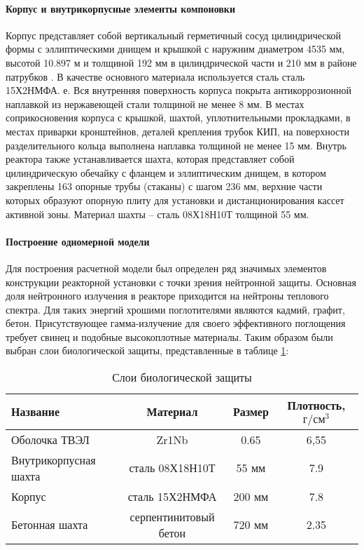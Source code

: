 \paragraph{Корпус и внутрикорпусные элементы компоновки} Корпус представляет собой вертикальный герметичный сосуд
цилиндрической формы с эллиптическими днищем и крышкой  с наружним диаметром 4535 мм, высотой 10.897 м и толщиной 192 мм в цилиндрической части и 210 мм в районе патрубков \cite{лескин2011физические}. В качестве основного материала используется сталь сталь 15Х2НМФА. е. Вся внутренняя поверхность корпуса покрыта
антикоррозионной наплавкой из нержавеющей стали толщиной не
менее 8 мм. В местах соприкосновения корпуса с крышкой, шахтой, уплотнительными прокладками, в местах приварки
кронштейнов, деталей крепления трубок КИП, на поверхности разделительного кольца выполнена наплавка толщиной не менее
15 мм. Внутрь реактора также устанавливается шахта, которая  представляет собой цилиндрическую обечайку с фланцем и эллиптическим днищем, в котором закреплены 163 опорные
трубы (стаканы) с шагом 236 мм, верхние части которых образуют
опорную плиту для установки и дистанционирования кассет активной зоны. Материал шахты – сталь 08Х18Н10Т толщиной 55 мм.

\paragraph{Построение одномерной модели} Для построения расчетной модели был определен ряд значимых элементов конструкции реакторной установки с точки зрения нейтронной защиты. 
Основная доля нейтронного излучения в реакторе приходится на нейтроны теплового спектра. Для таких энергий хрошими поглотителями являются кадмий, графит, бетон. 
Присутствующее гамма-излучение для своего эффективного поглощения требует свинец и подобные высокоплотные материалы. Таким образом были выбран слои биологической защиты, представленные в таблице \ref{tabular:bio-sec-layers}:

\begin{table}[H]
	\caption{Слои биологической защиты}
	\begin{center}
        \begin{tabular}{|l|c|c|c|}
        \toprule
         Название & Материал & Размер & Плотность, $\text{г}/\text{см}^3$ \\ 
         \midrule
         \hline
         Оболочка ТВЭЛ & Zr1Nb & 0.65 & 6,55\\ 
         \hline
         Внутрикорпусная шахта & сталь 08Х18Н10Т & 55 мм & 7.9 \\ 
         \hline
         Корпус & сталь 15Х2НМФА & 200 мм & 7.8 \\ 
         \hline
         Бетонная шахта & серпентинитовый бетон & 720 мм & 2.35 \\ 
         \bottomrule
		\end{tabular}
		\label{tabular:bio-sec-layers}
	\end{center}
\end{table}

